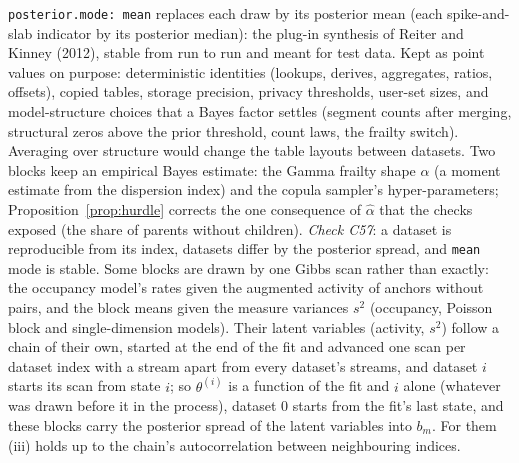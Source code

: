 \noindent \texttt{posterior.mode: mean} replaces each draw by its posterior mean (each spike-and-slab indicator by its posterior median): the plug-in synthesis of Reiter and Kinney (2012), stable from run to run and meant for test data. Kept as point values on purpose: deterministic identities (lookups, derives, aggregates, ratios, offsets), copied tables, storage precision, privacy thresholds, user-set sizes, and model-structure choices that a Bayes factor settles (segment counts after merging, structural zeros above the prior threshold, count laws, the frailty switch). Averaging over structure would change the table layouts between datasets. Two blocks keep an empirical Bayes estimate: the Gamma frailty shape $\alpha$ (a moment estimate from the dispersion index) and the copula sampler's hyper-parameters; Proposition~\ref{prop:hurdle} corrects the one consequence of $\hat\alpha$ that the checks exposed (the share of parents without children). \emph{Check C57}: a dataset is reproducible from its index, datasets differ by the posterior spread, and \texttt{mean} mode is stable. Some blocks are drawn by one Gibbs scan rather than exactly: the occupancy model's rates given the augmented activity of anchors without pairs, and the block means given the measure variances $s^2$ (occupancy, Poisson block and single-dimension models). Their latent variables (activity, $s^2$) follow a chain of their own, started at the end of the fit and advanced one scan per dataset index with a stream apart from every dataset's streams, and dataset $i$ starts its scan from state $i$; so $\theta^{(i)}$ is a function of the fit and $i$ alone (whatever was drawn before it in the process), dataset 0 starts from the fit's last state, and these blocks carry the posterior spread of the latent variables into $b_m$. For them (iii) holds up to the chain's autocorrelation between neighbouring indices.

